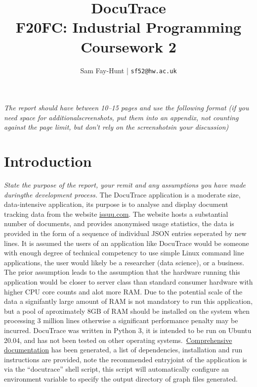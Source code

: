 \documentclass[11pt]{article}
\begin{document}
\title{%
	\bf DocuTrace\\ 
    \large F20FC: Industrial Programming\\
    Coursework 2}

\author{
	Sam Fay-Hunt | \texttt{sf52@hw.ac.uk}
}

\maketitle
\thispagestyle{empty}
\pagebreak


\tableofcontents
\thispagestyle{empty}
\pagebreak


\setcounter{page}{1}

\emph{The report should have between 10–15 pages and use the following format (if you need space for additionalscreenshots, put them into an appendix, not counting against the page limit, but don’t rely on the screenshotsin your discussion)}

\section{Introduction}
\emph{State the purpose of the report, your remit and any assumptions you have made duringthe development process.}
The DocuTrace application is a moderate size, data-intensive application, its purpose is to analyse and display document tracking data from the website \href{https://issuu.com/}{issuu.com}. 
The website hosts a substantial number of documents, and provides anonymised usage statistics, the data is provided in the form of a sequence of individual JSON entries seperated by new lines.
It is assumed the users of an application like DocuTrace would be someone with enough degree of technical competency to use simple Linux command line applications, the user would likely be a researcher (data science), or a business. 
The prior assumption leads to the assumption that the hardware running this application would be closer to server class than standard consumer hardware with higher CPU core counts and alot more RAM.
Due to the potential scale of the data a  signifantly large amount of RAM is not mandatory to run this application, but a pool of aproximately 8GB of RAM should be installed on the system when processing 3 million lines otherwise a significant performance penalty may be incurred.
DocuTrace was written in Python 3, it is intended to be run on Ubuntu 20.04, and has not been tested on other operating systems.~\href{https://www2.macs.hw.ac.uk/~sf52/DocuTrace/html/readme.html}{Comprehensive documentation} has been generated, a list of dependencies, installation and run instructions are provided, note the recommended entryjoint of the application is via the ``docutrace'' shell script, this script will automatically configure an environment variable to specify the output directory of graph files generated.
\end{document}
